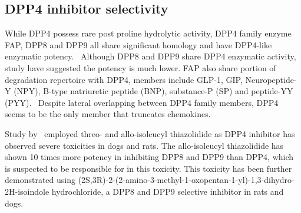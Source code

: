 \subsection{DPP4 inhibitor selectivity}
While DPP4 possess rare post proline hydrolytic activity, DPP4 family enzyme FAP, DPP8 and DPP9 all share significant homology and have DPP4-like enzymatic potency.~\cite{Kirby_2010,Thornberry_2007} Although DPP8 and DPP9 share DPP4 enzymatic activity, study have suggested the potency is much lower. FAP also share portion of degradation repertoire with DPP4, members include GLP-1, GIP, Neuropeptide-Y (NPY), B-type natriuretic peptide (BNP), substance-P (SP) and peptide-YY (PYY).~\cite{Keane_2011} Despite lateral overlapping between DPP4 family members, DPP4 seems to be the only member that truncates chemokines.~\cite{Keane_2011}  
\par 
Study by~\citet{Lankas2005} employed threo- and allo-isoleucyl thiazolidide as DPP4 inhibitor has observed severe toxicities in dogs and rats. The allo-isoleucyl thiazolidide has shown 10 times more potency in inhibiting DPP8 and DPP9 than DPP4, which is suspected to be responsible for in this toxicity. This toxicity has been further demonstrated using  (2S,3R)-2-(2-amino-3-methyl-1-oxopentan-1-yl)-1,3-dihydro-2H-isoindole hydrochloride, a DPP8 and DPP9 selective inhibitor in rats and dogs.  
